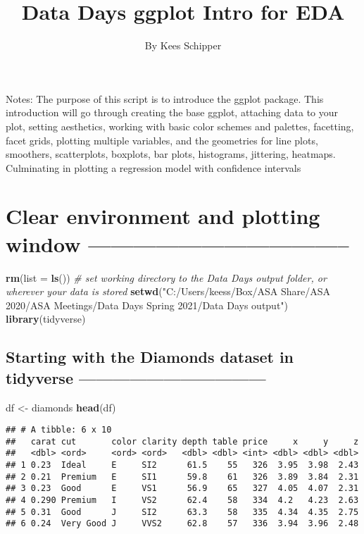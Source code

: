 \documentclass[
]{article}
\title{Data Days ggplot Intro for EDA}
\subtitle{By Kees Schipper}
\author{}
\date{\vspace{-2.5em}}
\newenvironment{Shaded}{\begin{snugshade}}{\end{snugshade}}
\newcommand{\CommentTok}[1]{\textcolor[rgb]{0.56,0.35,0.01}{\textit{#1}}}
\newcommand{\DataTypeTok}[1]{\textcolor[rgb]{0.13,0.29,0.53}{#1}}
\newcommand{\KeywordTok}[1]{\textcolor[rgb]{0.13,0.29,0.53}{\textbf{#1}}}
\newcommand{\NormalTok}[1]{#1}
\newcommand{\StringTok}[1]{\textcolor[rgb]{0.31,0.60,0.02}{#1}}
\begin{document}
\maketitle

Notes: The purpose of this script is to introduce the ggplot package.
This introduction will go through creating the base ggplot, attaching
data to your plot, setting aesthetics, working with basic color schemes
and palettes, facetting, facet grids, plotting multiple variables, and
the geometries for line plots, smoothers, scatterplots, boxplots, bar
plots, histograms, jittering, heatmaps. Culminating in plotting a
regression model with confidence intervals

\hypertarget{clear-environment-and-plotting-window}{%
\section{Clear environment and plotting window
-----------------------------------}\label{clear-environment-and-plotting-window}}

\begin{Shaded}
\begin{Highlighting}[]
\KeywordTok{rm}\NormalTok{(}\DataTypeTok{list =} \KeywordTok{ls}\NormalTok{())}
\CommentTok{# set working directory to the Data Days output folder, or wherever your data is stored}
\KeywordTok{setwd}\NormalTok{(}\StringTok{"C:/Users/keess/Box/ASA Share/ASA 2020/ASA Meetings/Data Days Spring 2021/Data Days output"}\NormalTok{)}
\KeywordTok{library}\NormalTok{(tidyverse)}
\end{Highlighting}
\end{Shaded}

\hypertarget{starting-with-the-diamonds-dataset-in-tidyverse}{%
\subsection{Starting with the Diamonds dataset in tidyverse
---------------------------------}\label{starting-with-the-diamonds-dataset-in-tidyverse}}

\begin{Shaded}
\begin{Highlighting}[]
\NormalTok{df <-}\StringTok{ }\NormalTok{diamonds}
\KeywordTok{head}\NormalTok{(df)}
\end{Highlighting}
\end{Shaded}

\begin{verbatim}
## # A tibble: 6 x 10
##   carat cut       color clarity depth table price     x     y     z
##   <dbl> <ord>     <ord> <ord>   <dbl> <dbl> <int> <dbl> <dbl> <dbl>
## 1 0.23  Ideal     E     SI2      61.5    55   326  3.95  3.98  2.43
## 2 0.21  Premium   E     SI1      59.8    61   326  3.89  3.84  2.31
## 3 0.23  Good      E     VS1      56.9    65   327  4.05  4.07  2.31
## 4 0.290 Premium   I     VS2      62.4    58   334  4.2   4.23  2.63
## 5 0.31  Good      J     SI2      63.3    58   335  4.34  4.35  2.75
## 6 0.24  Very Good J     VVS2     62.8    57   336  3.94  3.96  2.48
\end{verbatim}
\end{document}
